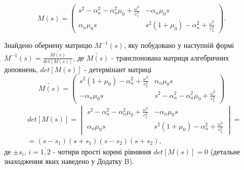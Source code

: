 
\begin{equation}
    M(s) = \begin{pmatrix}
        s^2 - \alpha_n^2 - \alpha_n^2\mu_0 + \frac{\omega^2}{c_1^2} & -\alpha_n \mu_0 s \\
        \alpha_n \mu_0 s & s^2 (1 + \mu_0) -\alpha_n^2 + \frac{\omega^2}{c_2^2}
     \end{pmatrix}.
\end{equation}

Знайдено обернену матрицю $M^{-1}(s)$, яку побудовано у наступній формі $M^{-1}(s) = \frac{\widetilde{M(s)}}{det[M(s)]}$, де $\widetilde{M(s)}$ - транспонована матриця алгебричних доповнень,
$det[M(s)]$ - детермінант матриці
\begin{equation}
    \widetilde{M(s)} = \begin{pmatrix}
        s^2 (1 + \mu_0) -\alpha_n^2 + \frac{\omega^2}{c_2^2} & \alpha_n \mu_0 s \\
        -\alpha_n \mu_0 s & s^2 - \alpha_n^2 - \alpha_n^2\mu_0 + \frac{\omega^2}{c_1^2}
     \end{pmatrix}
\end{equation}
\begin{align}
    &det[M(s)] = \begin{vmatrix}
        s^2 - \alpha_n^2 - \alpha_n^2\mu_0 + \frac{\omega^2}{c_1^2} & -\alpha_n \mu_0 s \\
        \alpha_n \mu_0 s & s^2 (1 + \mu_0) -\alpha_n^2 + \frac{\omega^2}{c_2^2}
     \end{vmatrix} = \nonumber \\
    &=(s - s_1)(s + s_1)(s - s_2)(s + s_2),
\end{align}
де $\pm s_i$, $i=\overline{1, 2}$ - чотири прості корені рівняння $det[M(s)]=0$ (детальне знаходження яких наведено у Додатку B).

